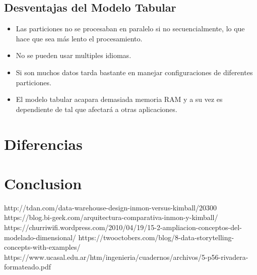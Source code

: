 \documentclass[preprint,12pt]{elsarticle}
\begin{document}
\subsection{Desventajas del Modelo Tabular}

\begin{itemize}
	\item Las particiones no se procesaban en paralelo si no secuencialmente, lo que hace que sea más lento el procesamiento.
	\item No se pueden usar multiples idiomas.
	\item Si son muchos datos tarda bastante en manejar configuraciones de diferentes particiones.
	\item El modelo tabular acapara demasiada memoria RAM y a su vez es dependiente de tal que afectará a otras aplicaciones.
\end{itemize}


\section{Diferencias}

\section{Conclusion}


	
	

	
	
	\newpage
	
	   \begin{thebibliography}{0}
                  http://tdan.com/data-warehouse-design-inmon-versus-kimball/20300
                   https://blog.bi-geek.com/arquitectura-comparativa-inmon-y-kimball/
                   https://churriwifi.wordpress.com/2010/04/19/15-2-ampliacion-conceptos-del-modelado-dimensional/
                     https://twooctobers.com/blog/8-data-storytelling-concepts-with-examples/
                   https://www.ucasal.edu.ar/htm/ingenieria/cuadernos/archivos/5-p56-rivadera-formateado.pdf

         \end{thebibliography}
	
\end{document}
